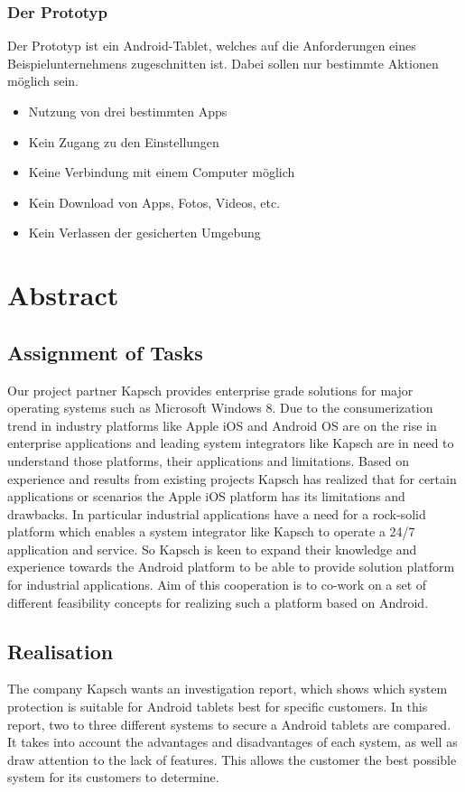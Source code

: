 \subsection*{Der Prototyp}
Der Prototyp ist ein Android-Tablet, welches auf die Anforderungen eines Beispielunternehmens zugeschnitten ist. Dabei sollen nur bestimmte Aktionen möglich sein. 
\begin{itemize}
	\item Nutzung von drei bestimmten Apps
	\item Kein Zugang zu den Einstellungen
	\item Keine Verbindung mit einem Computer möglich
	\item Kein Download von Apps, Fotos, Videos, etc.
	\item Kein Verlassen der gesicherten Umgebung
\end{itemize}

\newpage

\chapter*{Abstract}
\section*{Assignment of Tasks}
Our project partner Kapsch provides enterprise grade solutions for major operating systems such as Microsoft Windows 8. Due to the consumerization trend in industry platforms like Apple iOS and Android OS are on the rise in enterprise applications and leading system integrators like Kapsch are in need to understand those platforms, their applications and limitations. Based on experience and results from existing projects Kapsch has realized that for certain applications or scenarios the Apple iOS platform has its limitations and drawbacks. In particular industrial applications have a need for a rock-solid platform which enables a system integrator like Kapsch to operate a 24/7 application and service. So Kapsch is keen to expand their knowledge and experience towards the Android platform to be able to provide solution platform for industrial applications.
Aim of this cooperation is to co-work on a set of different feasibility concepts for realizing such a platform based on Android.
\section*{Realisation}
The company Kapsch wants an investigation report, which shows which system protection is suitable for Android tablets best for specific customers. In this report, two to three different systems to secure a Android tablets are compared. It takes into account the advantages and disadvantages of each system, as well as draw attention to the lack of features. This allows the customer the best possible system for its customers to determine.

